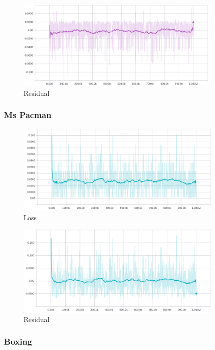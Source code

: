 \documentclass{article}
\begin{document}
\begin{figure}[H]
  \centering
  \includegraphics[width=0.9\textwidth]{B3/pong_residual.png}
  \caption{Residual}
\end{figure}

\subsubsection{Ms Pacman}

\begin{figure}[H]
  \centering
  \includegraphics[width=0.9\textwidth]{B3/pacman_loss.png}
  \caption{Loss}
\end{figure}

\begin{figure}[H]
  \centering
  \includegraphics[width=0.9\textwidth]{B3/pacman_residual.png}
  \caption{Residual}
\end{figure}

\subsubsection{Boxing}
\end{document}
